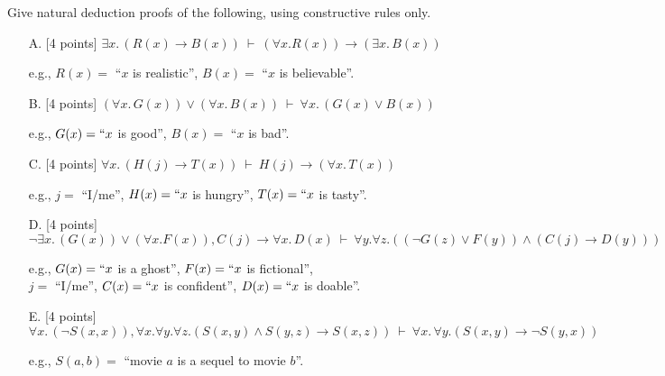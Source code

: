 \documentclass[12pt,letterpaper,boxed,cm]{hmcpset}
\newcommand{\pn}[1]{\left( #1 \right)}
\newcommand{\ra}[0]{\rightarrow}
\newcommand{\cp}[0]{~\vdash~}
\begin{document}

\begin{problem}[1.]
    [20 points] Give natural deduction proofs of the following, using constructive rules only.
    \begin{enumerate}
        \item [A.] [4 points] $\exists x.\,\pn{R(x) \ra B(x)}   \cp  (\forall x .R(x)) \ra \pn{\exists x.\,B(x)}$
        \begin{flushright}
            e.g., $R(x) =$ ``$x$ is realistic'', $B(x)=$ ``$x$ is believable''.   
        \end{flushright}
        \item [B.] [4 points] $(\forall x.\, G(x)) \lor (\forall x.\, B(x))  \cp  \forall x.\,  (G(x) \lor B(x))$
        \begin{flushright}
            e.g., $G(x) = ``x$ is good'', $B(x) =$ ``$x$ is bad''.   
        \end{flushright}
        \item [C.] [4 points] $\forall x.\, (H(j) \ra T(x)) \cp H(j) \ra (\forall x.\,T(x))$
        \begin{flushright}
            e.g., $j =$ ``I/me'', $H(x) = ``x$ is hungry'', $T(x) = ``x$ is tasty''.   
        \end{flushright}
        \item [D.] [4 points] \\ $\neg\exists x.\,(G(x)) \lor (\forall x.F(x)),  C(j) \ra\forall x.\, D(x)\cp  \forall y.\forall z. ( (\neg G(z) \lor F(y)) \land (C(j)\ra D(y)) )$
        \begin{flushright}
            e.g., $G(x) = ``x$ is a ghost'', $F(x) = ``x$ is fictional'',\\
            $j  =$ ``I/me'', $C(x) = ``x$ is confident'', $D(x) = ``x$ is doable''.   
        \end{flushright}
        \item [E.] [4 points] \\ $\forall x.\,(\neg S(x,x)), \forall x.\forall y.\forall z.(S(x,y)\land S(y,z) \ra S(x,z))\cp  \forall x.\,\forall y. (S(x,y) \ra \neg S(y,x))$
        \begin{flushright}
            e.g., $S(a,b) =$ ``movie $a$ is a sequel to movie $b$''.
        \end{flushright}
    \end{enumerate}
\end{problem}

\begin{solution}
    \vfill
\end{solution}
\newpage
\end{document}
